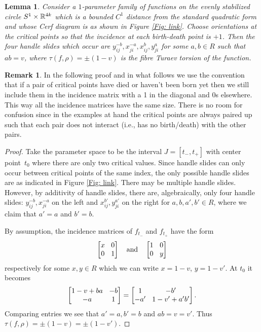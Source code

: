 \documentclass[11pt]{article}
\newcommand{\ie}{i.e.,\xspace}
\numberwithin{equation}{section}\providecommand{\dpl}{\displaystyle}
\theoremstyle{plain}
\newtheorem{lemma}[theorem]{Lemma}
\theoremstyle{definition}
\newtheorem{remark}[theorem]{Remark}
\newcommand{\mat}[1]{\ensuremath{
\left[\begin{matrix}#1
\end{matrix}\right]
}}
\begin{document}
\begin{lemma}\label{lem: ab=v}
Consider a $1$-parameter family of functions on the evenly stabilized circle $S^1\times \mathbb{R}^{4k}$ which is a bounded $C^1$ distance from the standard quadratic form and whose Cerf diagram is as shown in Figure \ref{Fig: link}. Choose orientations at the critical points so that the incidence at each birth-death point is $+1$. Then the four handle slides which occur are $y_{ij}^{-b},x_{ji}^{-a}, x_{ij}^{b},y_{ji}^{a}$ for some $a,b\in R$ such that
$ab=v$, where $\tau(f,\rho)=\pm(1-v)$ is the fibre Turaev torsion of the function.
\end{lemma}

\begin{remark}
In the following proof and in what follows we use the convention that if a pair of critical points have died or haven't been born yet then we still include them in the incidence matrix with a 1 in the diagonal and 0s elsewhere. This way all the incidence matrices have the same size. There is no room for confusion since in the examples at hand the critical points are always paired up such that each pair does not interact (\ie has no birth/death) with the other pairs.
\end{remark}

\begin{proof}
Take the parameter space to be the interval $J=[t_-,t_+]$ with center point~$t_0$ where there are only two critical values. Since handle slides can only occur between critical points of the same index, the only possible handle slides are as indicated in Figure \ref{Fig: link}. There may be multiple handle slides. However, by additivity of handle slides, there are, algebraically, only four handle slides: $y_{ij}^{-b}, x_{ji}^{-a}$ on the left and $x_{ij}^{b'},y_{ji}^{a'}$ on the right for $a,b,a',b'\in R$, where we claim that $a'=a$ and $b'=b$.

By assumption, the incidence matrices of $f_{t_-}$ and $f_{t_+}$ have the form
\[\arraycolsep4.5pt
\mat{x&0\\0&1}\quad\text{and}\quad \mat{1 & 0\\0& y}
\]
respectively for some $x,y\in R$ which we can write $x=1-v$, $y=1-v'$. At $t_0$ it becomes
\[\arraycolsep4.5pt
\mat{1-v+ba & -b\\ -a & 1}=\mat{1 & -b'\\ -a' & 1-v'+a'b'}.
\]
Comparing entries we see that $a'=a, b'=b$ and $ab=v=v'$. Thus $\tau(f,\rho)=\pm(1-v )=\pm(1-v' )$.
\end{proof}
\end{document}
